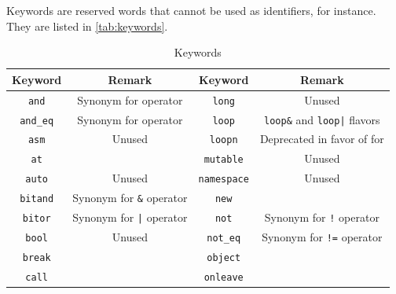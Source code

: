 \documentclass[openright,twoside,12pt]{report}
\newcommand{\tab}[1]{\autoref{tab:#1}}
\begin{document}
Keywords are reserved words that cannot be used as identifiers, for
instance.  They are listed in \tab{keywords}.


\renewcommand{\baselinestretch}{.85}
\begin{table}[htp]
  \caption{Keywords}
  \label{tab:keywords}
  \centering
  \begin{tabular}{|c|c||c|c|}
    \hline
    Keyword                       & Remark                                  &
    Keyword                       & Remark                                  \\
    \hline
    \lstinline"and"               & Synonym for  operator                   &
    \lstinline"long"              & Unused                                  \\
    \lstinline"and_eq"            & Synonym for  operator                   &
    \lstinline"loop"              & \lstinline|loop&| and
                                    \lstinline-loop|- flavors               \\
    \lstinline"asm"               & Unused                                  &
    \lstinline"loopn"             & Deprecated in favor of for              \\
    \lstinline"at"                &                                         &
    \lstinline"mutable"           & Unused                                  \\
    \lstinline"auto"              & Unused                                  &
    \lstinline"namespace"         & Unused                                  \\
    \lstinline"bitand"            & Synonym for \lstinline|&| operator      &
    \lstinline"new"               &                                         \\
    \lstinline"bitor"             & Synonym for \lstinline-|- operator      &
    \lstinline"not"               & Synonym for \lstinline|!| operator      \\
    \lstinline"bool"              & Unused                                  &
    \lstinline"not_eq"            & Synonym for \lstinline|!=| operator     \\
    \lstinline"break"             &                                         &
    \lstinline"object"            &                                         \\
    \lstinline"call"              &                                         &
    \lstinline"onleave"           &                                         \\

\end{tabular}
\end{table}
\end{document}

